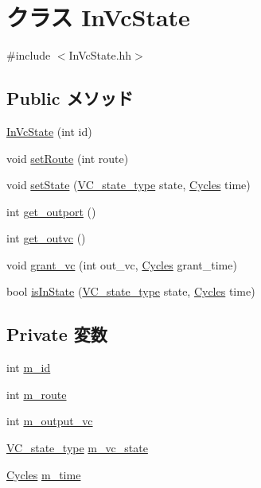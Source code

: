 \hypertarget{classInVcState}{
\section{クラス InVcState}
\label{classInVcState}
}


{\ttfamily \#include $<$InVcState.hh$>$}\subsection*{Public メソッド}
\begin{DoxyCompactItemize}
\item 
\hyperlink{classInVcState_a9b5c184b8713de2f4faae10915d2931a}{InVcState} (int id)
\item 
void \hyperlink{classInVcState_aacdd073cbcdcd8b22630bd91eff91612}{setRoute} (int route)
\item 
void \hyperlink{classInVcState_a4ac4ce58e7eac1aee69c9891552538ec}{setState} (\hyperlink{NetworkHeader_8hh_aaafaa208359111dcd9f4d47ff377da76}{VC\_\-state\_\-type} state, \hyperlink{classCycles}{Cycles} time)
\item 
int \hyperlink{classInVcState_a47a477d5bcd6a5d32aa4028e103f06ca}{get\_\-outport} ()
\item 
int \hyperlink{classInVcState_a24b86446f92393208caa8f73c96d121f}{get\_\-outvc} ()
\item 
void \hyperlink{classInVcState_a2345abcd6b8dd8d45bc24b3576bdbb62}{grant\_\-vc} (int out\_\-vc, \hyperlink{classCycles}{Cycles} grant\_\-time)
\item 
bool \hyperlink{classInVcState_a798660c27b9ee51b885d15feac2a482c}{isInState} (\hyperlink{NetworkHeader_8hh_aaafaa208359111dcd9f4d47ff377da76}{VC\_\-state\_\-type} state, \hyperlink{classCycles}{Cycles} time)
\end{DoxyCompactItemize}
\subsection*{Private 変数}
\begin{DoxyCompactItemize}
\item 
int \hyperlink{classInVcState_aad966617e7e050bedbead762727808a5}{m\_\-id}
\item 
int \hyperlink{classInVcState_aa268143da778d6edf497765655382f87}{m\_\-route}
\item 
int \hyperlink{classInVcState_a8ed6a5033ed26f0b6181539a86ae153b}{m\_\-output\_\-vc}
\item 
\hyperlink{NetworkHeader_8hh_aaafaa208359111dcd9f4d47ff377da76}{VC\_\-state\_\-type} \hyperlink{classInVcState_a86eb725d7cda610fb5009d20a3690a4d}{m\_\-vc\_\-state}
\item 
\hyperlink{classCycles}{Cycles} \hyperlink{classInVcState_ac39faf9ea84c2e7518ba2f960c661636}{m\_\-time}
\end{DoxyCompactItemize}


